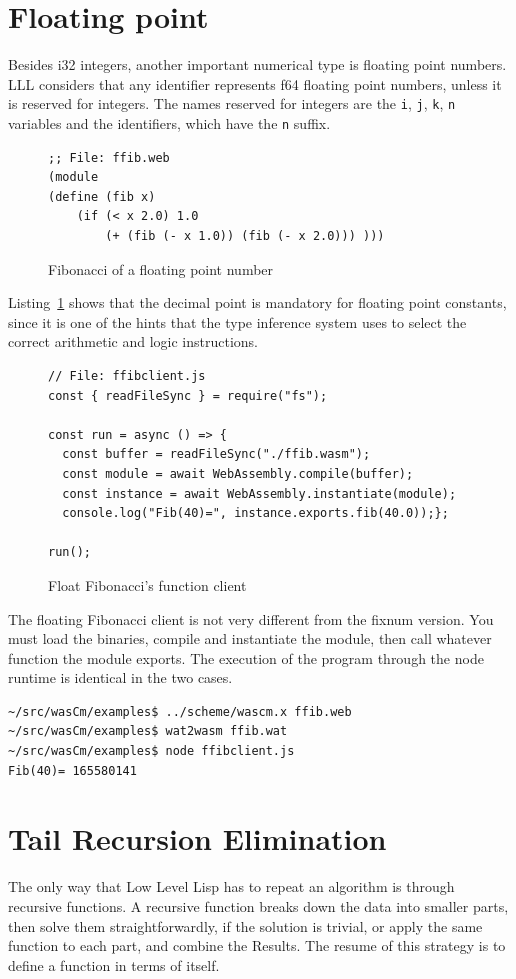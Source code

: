 \documentclass[a4paper,12pt]{book}
\begin{document}
\section{Floating point}
Besides i32 integers, another important numerical type
is floating point numbers. LLL considers that
any identifier represents f64 floating point numbers,
unless it is reserved for integers. The names
reserved for integers are the \verb|i|, \verb|j|,
\verb|k|, \verb|n| variables and the identifiers,
which have the \verb|n| suffix.

\begin{figure}[!h]
\begin{verbatim}
;; File: ffib.web
(module
(define (fib x)
    (if (< x 2.0) 1.0
        (+ (fib (- x 1.0)) (fib (- x 2.0))) )))
\end{verbatim}
  \caption{Fibonacci of a floating point number}
  \label{wasm:float-fibonacci}
\end{figure}

Listing~\ref{wasm:float-fibonacci} shows that the
decimal point is mandatory for floating point
constants, since it is one of the hints that the
type inference system uses to select the correct
arithmetic and logic instructions.

\begin{figure}[!h]
\begin{verbatim}
// File: ffibclient.js
const { readFileSync } = require("fs");

const run = async () => {
  const buffer = readFileSync("./ffib.wasm");
  const module = await WebAssembly.compile(buffer);
  const instance = await WebAssembly.instantiate(module);
  console.log("Fib(40)=", instance.exports.fib(40.0));};

run();
\end{verbatim}
  \caption{Float Fibonacci's function client}
  \label{wasm:ffibclient}
\end{figure}


The floating Fibonacci client is not very different
from the fixnum version. You must load the binaries,
compile and instantiate the module, then call
whatever function the module exports. The execution
of the program through the node runtime is identical
in the two cases.
\begin{verbatim}
~/src/wasCm/examples$ ../scheme/wascm.x ffib.web
~/src/wasCm/examples$ wat2wasm ffib.wat
~/src/wasCm/examples$ node ffibclient.js
Fib(40)= 165580141
\end{verbatim}

\section{Tail Recursion Elimination}
The only way that Low Level Lisp has
to repeat an algorithm is through
recursive functions. A recursive function 
breaks down the data into smaller parts,
then solve them straightforwardly,
if the solution is trivial, or apply
the same function to each part, and combine
the Results. The resume of this strategy
is to define a function in terms of itself.
\end{document}
